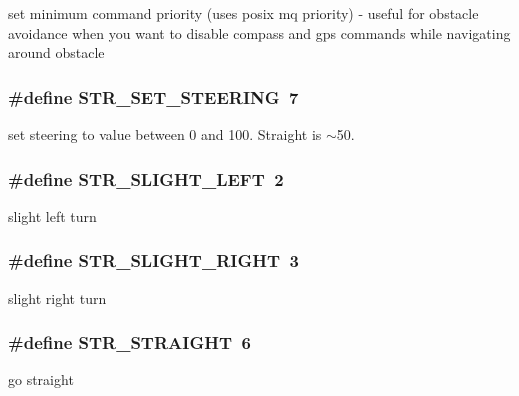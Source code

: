 set minimum command priority (uses posix mq priority) -\/ useful for obstacle avoidance when you want to disable compass and gps commands while navigating around obstacle \hypertarget{group__steering__commands_ga3944f02514d51b9a5fad5def73a3d492}{
\subsubsection[{S\-T\-R\-\_\-\-S\-E\-T\-\_\-\-S\-T\-E\-E\-R\-I\-N\-G}]{\setlength{\rightskip}{0pt plus 5cm}\#define S\-T\-R\-\_\-\-S\-E\-T\-\_\-\-S\-T\-E\-E\-R\-I\-N\-G~7}}\label{group__steering__commands_ga3944f02514d51b9a5fad5def73a3d492}
set steering to value between 0 and 100. Straight is $\sim$50. \hypertarget{group__steering__commands_ga0bf8759a57b2161c90c56b4186545018}{
\subsubsection[{S\-T\-R\-\_\-\-S\-L\-I\-G\-H\-T\-\_\-\-L\-E\-F\-T}]{\setlength{\rightskip}{0pt plus 5cm}\#define S\-T\-R\-\_\-\-S\-L\-I\-G\-H\-T\-\_\-\-L\-E\-F\-T~2}}\label{group__steering__commands_ga0bf8759a57b2161c90c56b4186545018}
slight left turn \hypertarget{group__steering__commands_ga7872976a47fb31b04cb5c4328d0b3779}{
\subsubsection[{S\-T\-R\-\_\-\-S\-L\-I\-G\-H\-T\-\_\-\-R\-I\-G\-H\-T}]{\setlength{\rightskip}{0pt plus 5cm}\#define S\-T\-R\-\_\-\-S\-L\-I\-G\-H\-T\-\_\-\-R\-I\-G\-H\-T~3}}\label{group__steering__commands_ga7872976a47fb31b04cb5c4328d0b3779}
slight right turn \hypertarget{group__steering__commands_ga85d1e93794cb6ca3f82ba6b211897ac6}{
\subsubsection[{S\-T\-R\-\_\-\-S\-T\-R\-A\-I\-G\-H\-T}]{\setlength{\rightskip}{0pt plus 5cm}\#define S\-T\-R\-\_\-\-S\-T\-R\-A\-I\-G\-H\-T~6}}\label{group__steering__commands_ga85d1e93794cb6ca3f82ba6b211897ac6}
go straight 
